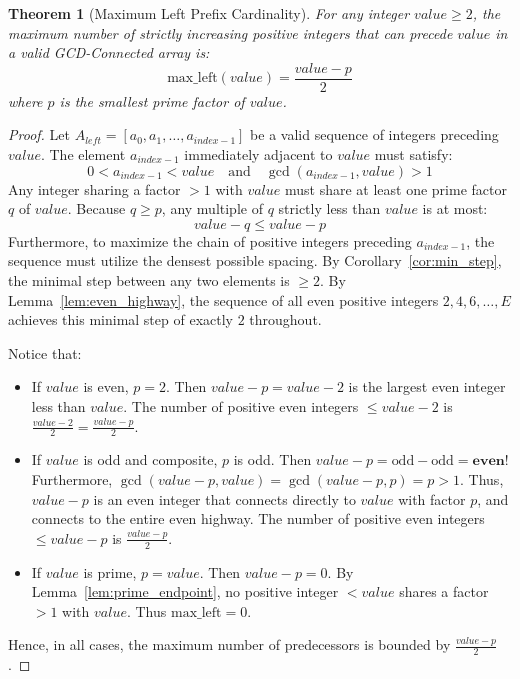 \documentclass[10pt,journal,compsoc,onecolumn]{IEEEtran}
\newtheorem{theorem}{Theorem}
\begin{document}
\begin{theorem}[Maximum Left Prefix Cardinality]
\label{thm:max_left}
For any integer $value \ge 2$, the maximum number of strictly increasing positive integers that can precede $value$ in a valid GCD-Connected array is:
\begin{equation}
\text{max\_left}(value) = \frac{value - p}{2}
\end{equation}
where $p$ is the smallest prime factor of $value$.
\end{theorem}
\begin{proof}
Let $A_{left} = [a_0, a_1, \dots, a_{index-1}]$ be a valid sequence of integers preceding $value$. The element $a_{index-1}$ immediately adjacent to $value$ must satisfy:
\begin{equation}
0 < a_{index-1} < value \quad \text{and} \quad \gcd(a_{index-1}, value) > 1
\end{equation}
Any integer sharing a factor $> 1$ with $value$ must share at least one prime factor $q$ of $value$. Because $q \ge p$, any multiple of $q$ strictly less than $value$ is at most:
\begin{equation}
value - q \le value - p
\end{equation}
Furthermore, to maximize the chain of positive integers preceding $a_{index-1}$, the sequence must utilize the densest possible spacing. By Corollary~\ref{cor:min_step}, the minimal step between any two elements is $\ge 2$. By Lemma~\ref{lem:even_highway}, the sequence of all even positive integers $2, 4, 6, \dots, E$ achieves this minimal step of exactly $2$ throughout.

Notice that:
\begin{itemize}
    \item If $value$ is even, $p = 2$. Then $value - p = value - 2$ is the largest even integer less than $value$. The number of positive even integers $\le value - 2$ is $\frac{value - 2}{2} = \frac{value - p}{2}$.
    \item If $value$ is odd and composite, $p$ is odd. Then $value - p = \text{odd} - \text{odd} = \textbf{even}$! Furthermore, $\gcd(value - p, value) = \gcd(value - p, p) = p > 1$. Thus, $value - p$ is an even integer that connects directly to $value$ with factor $p$, and connects to the entire even highway. The number of positive even integers $\le value - p$ is $\frac{value - p}{2}$.
    \item If $value$ is prime, $p = value$. Then $value - p = 0$. By Lemma~\ref{lem:prime_endpoint}, no positive integer $< value$ shares a factor $> 1$ with $value$. Thus $\text{max\_left} = 0$.
\end{itemize}
Hence, in all cases, the maximum number of predecessors is bounded by $\frac{value - p}{2}$.
\end{proof}
\end{document}

